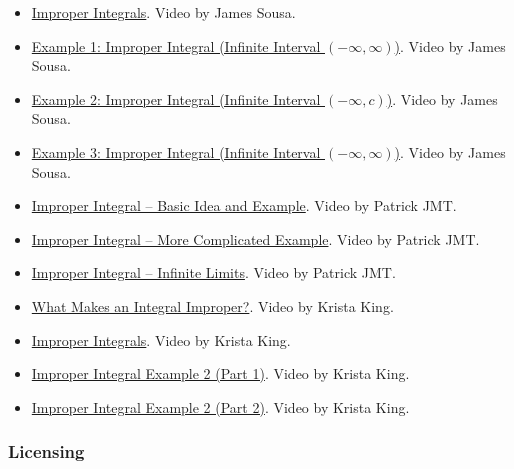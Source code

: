 \begin{itemize}

\item \href{https://youtu.be/F19y9IiH-cM}{Improper Integrals}.  
Video by James Sousa.

\item \href{https://youtu.be/qWMJpYajOww}{Example 1: Improper Integral (Infinite Interval $(-\infty,\infty)$)}.  
Video by James Sousa.

\item \href{https://youtu.be/q-l1WbnjKhw}{Example 2: Improper Integral (Infinite Interval $(-\infty, c)$)}.  
Video by James Sousa.

\item \href{https://youtu.be/8cc720Y_UWU}{Example 3: Improper Integral (Infinite Interval $(-\infty,\infty)$)}.  
Video by James Sousa.

\item \href{https://youtu.be/85-HNJyuyrU}{Improper Integral – Basic Idea and Example}.  
Video by Patrick JMT.

\item \href{https://youtu.be/KvC4XyayEC0}{Improper Integral – More Complicated Example}.  
Video by Patrick JMT.

\item \href{https://youtu.be/f6cGotvktxs}{Improper Integral – Infinite Limits}.  
Video by Patrick JMT.

\item \href{https://youtu.be/GZ-vy0bApWc}{What Makes an Integral Improper?}.  
Video by Krista King.

\item \href{https://youtu.be/DUowajlKIKA}{Improper Integrals}.  
Video by Krista King.

\item \href{https://youtu.be/266JzwOkSJs}{Improper Integral Example 2 (Part 1)}.  
Video by Krista King.

\item \href{https://youtu.be/6fVgBQMvVJY}{Improper Integral Example 2 (Part 2)}.  
Video by Krista King.

\end{itemize}

\subsubsection{Licensing}
\label{sss:lice-7352}

